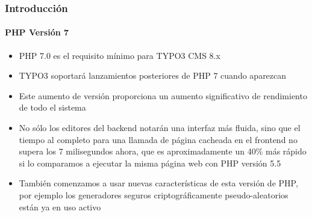 \begin{frame}[fragile]
	\frametitle{Introducción}
	\framesubtitle{PHP Versión 7}

	\begin{itemize}

		\item PHP 7.0 es el requisito mínimo para TYPO3 CMS 8.x
		\item TYPO3 soportará lanzamientos posteriores de PHP 7 cuando aparezcan
		\item Este aumento de versión proporciona un aumento significativo de rendimiento de todo el sistema

		\item No sólo los editores del backend notarán una interfaz más fluida, sino que el
			tiempo al completo para una llamada de página cacheada en el frontend no supera los
			7 milisegundos ahora, que es aproximadamente un 40\% más rápido si lo comparamos a ejecutar
			la misma página web con PHP versión 5.5

		\item También comenzamos a usar nuevas características de esta versión de PHP, por ejemplo
			los generadores seguros criptográficamente pseudo-aleatorios están ya en uso activo

	\end{itemize}

\end{frame}

